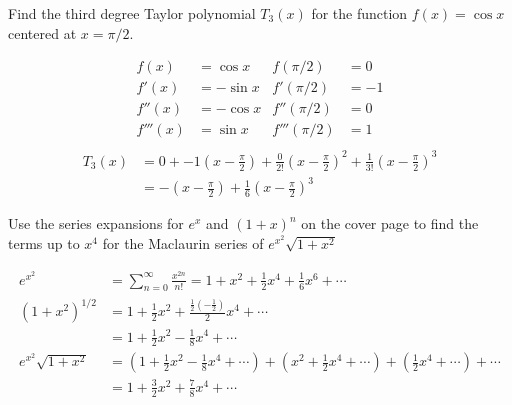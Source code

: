 \documentclass[12pt,answers]{exam}
\begin{document}
\begin{questions}
\newpage
\question[12]
Find the third degree Taylor polynomial $T_3(x)$ for the function $f(x) = \cos x$ centered at $x = \pi/2$.
\begin{solution}
    \begin{align*}
        f(x) &= \cos x 
        &f(\pi/2) &= 0 \\ 
        f'(x) &= -\sin x 
        &f'(\pi/2) &= -1 \\ 
        f''(x) &= -\cos x 
        &f''(\pi/2) &= 0 \\ 
        f'''(x) &= \sin x 
        &f'''(\pi/2) &= 1 \\ 
    \end{align*}
    \begin{align*}
        T_3(x) 
        &= 0 + -1\left(x-\frac\pi2\right) + \frac{0}{2!} \left(x-\frac\pi2\right)^2 + \frac{1}{3!}\left(x-\frac\pi2\right)^3 \\
        &= \boxed{-\left(x-\frac\pi2\right) + \frac16 \left(x-\frac\pi2\right)^3}
    \end{align*}
\end{solution}

\question[8]
Use the series expansions for $e^x$ and $(1+x)^n$ on the cover page to find the terms up to $x^4$ for the Maclaurin series of $e^{x^2} \sqrt{1+x^2}$
\begin{solution}
    \begin{align*}
        e^{x^2} 
        &= \sum_{n=0}^\infty \frac{x^{2n}}{n!} = 1 + x^2 + \frac 12 x^4 + \frac16 x^6 + \cdots \\ 
        (1+x^2)^{1/2} 
        &= 1 + \frac12 x^2 + \frac{\frac12 (-\frac12)}{2}x^4 + \cdots \\
        &= 1 + \frac12 x^2 - \frac18 x^4 + \cdots \\
        e^{x^2} \sqrt{1+x^2} 
        &= \left(1 + \frac12 x^2 - \frac 18 x^4 + \cdots \right)
        + \left( x^2 + \frac12 x^4 + \cdots \right)
        + \left(\frac12 x^4 + \cdots \right) + \cdots \\ 
        &= \boxed{1 + \frac32 x^2 + \frac78 x^4} + \cdots
    \end{align*}
\end{solution}

\newpage
\question
{}
\end{questions}
\end{document}
